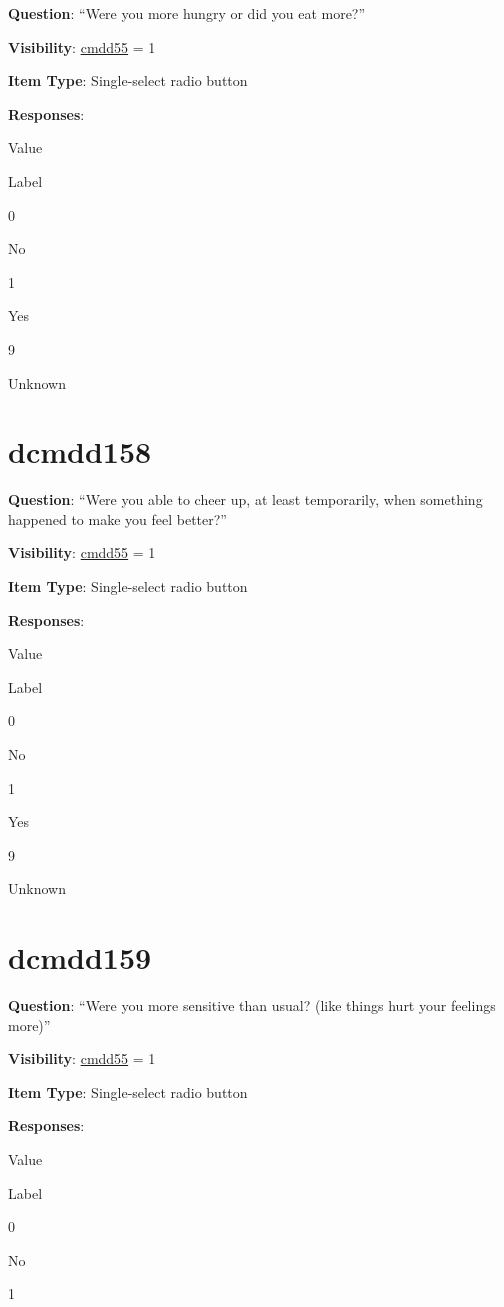 \documentclass[
]{book}
\begin{document}
\textbf{Question}: ``Were you more hungry or did you eat more?''

\textbf{Visibility}: \protect\hyperlink{cmdd55}{cmdd55} = 1

\textbf{Item Type}: Single-select radio button

\textbf{Responses}:

Value

Label

0

No

1

Yes

9

Unknown

\hypertarget{dcmdd158}{%
\section{dcmdd158}\label{dcmdd158}}

\textbf{Question}: ``Were you able to cheer up, at least temporarily, when something happened to make you feel better?''

\textbf{Visibility}: \protect\hyperlink{cmdd55}{cmdd55} = 1

\textbf{Item Type}: Single-select radio button

\textbf{Responses}:

Value

Label

0

No

1

Yes

9

Unknown

\hypertarget{dcmdd159}{%
\section{dcmdd159}\label{dcmdd159}}

\textbf{Question}: ``Were you more sensitive than usual? (like things hurt your feelings more)''

\textbf{Visibility}: \protect\hyperlink{cmdd55}{cmdd55} = 1

\textbf{Item Type}: Single-select radio button

\textbf{Responses}:

Value

Label

0

No

1
\end{document}
